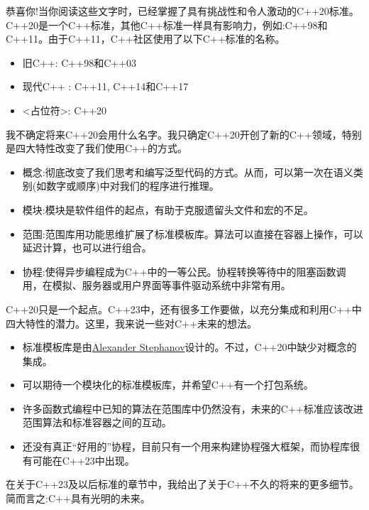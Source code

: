 恭喜你!当你阅读这些文字时，已经掌握了具有挑战性和令人激动的C++20标准。C++20是一个C++标准，其他C++标准一样具有影响力，例如:C++98和C++11。由于C++11，C++社区使用了以下C++标准的名称。

\begin{itemize}
\item 
旧C++: C++98和C++03

\item 
现代C++ : C++11, C++14和C++17

\item 
<占位符>: C++20
\end{itemize}
	
我不确定将来C++20会用什么名字。我只确定C++20开创了新的C++领域，特别是四大特性改变了我们使用C++的方式。

\begin{itemize}
\item 
概念:彻底改变了我们思考和编写泛型代码的方式。从而，可以第一次在语义类别(如数字或顺序)中对我们的程序进行推理。

\item 
模块:模块是软件组件的起点，有助于克服遗留头文件和宏的不足。

\item 
范围:范围库用功能思维扩展了标准模板库。算法可以直接在容器上操作，可以延迟计算，也可以进行组合。

\item 
协程:使得异步编程成为C++中的一等公民。协程转换等待中的阻塞函数调用，在模拟、服务器或用户界面等事件驱动系统中非常有用。
\end{itemize}

C++20只是一个起点。C++23中，还有很多工作要做，以充分集成和利用C++中四大特性的潜力。这里，我来说一些对C++未来的想法。

\begin{itemize}
\item 
标准模板库是由\href{https://en.wikipedia.org/wiki/Alexander_Stepanov}{Alexander Stephanov}设计的。不过，C++20中缺少对概念的集成。

\item 
可以期待一个模块化的标准模板库，并希望C++有一个打包系统。

\item 
许多函数式编程中已知的算法在范围库中仍然没有，未来的C++标准应该改进范围算法和标准容器之间的互动。

\item 
还没有真正“好用的”协程，目前只有一个用来构建协程强大框架，而协程库很有可能在C++23中出现。
\end{itemize}

在关于C++23及以后标准的章节中，我给出了关于C++不久的将来的更多细节。简而言之:C++具有光明的未来。






